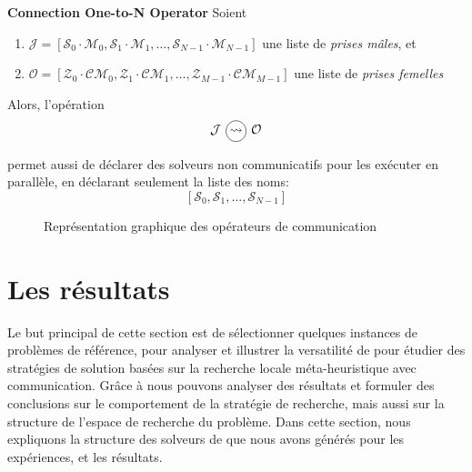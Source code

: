 \begin{definition}\label{op_conn:1ton}
{\bf Connection One-to-N Operator} Soient 
\begin{enumerate} 
\item $\mathcal{J} = \left[\mathcal{S}_0\cdot \mathcal{M}_0, \mathcal{S}_1\cdot \mathcal{M}_1,\dots, \mathcal{S}_{N-1}\cdot \mathcal{M}_{N-1}\right]$ une liste de  {\it prises mâles}, et
\item $\mathcal{O} = \left[\mathcal{Z}_0\cdot \mathcal{CM}_0, \mathcal{Z}_1\cdot \mathcal{CM}_1,\dots, \mathcal{Z}_{M-1}\cdot \mathcal{CM}_{M-1}\right]$ une liste de {\it prises femelles}
\end{enumerate} Alors, l'opération
\[
\mathcal{J} \poslop{\rightsquigarrow} \mathcal{O}
\]
\end{definition}


\posl{} permet aussi de déclarer des solveurs non communicatifs pour les exécuter en parallèle, en déclarant seulement la liste des noms:
\[
\left[\mathcal{S}_0, \mathcal{S}_1, \dots, \mathcal{S}_{N-1}\right]
\]

\begin{figure}[t]
\centering
{}
\hspace{0.05\textwidth}%
\caption[]{Représentation graphique des opérateurs de communication}
\label{fig:comm}
\end{figure}






\section{Les résultats}

Le but principal de cette section est de sélectionner quelques instances de problèmes de référence, pour analyser et illustrer la versatilité de \posl{} pour étudier des stratégies de solution basées sur la recherche locale méta-heuristique avec communication. Grâce à \posl{} nous pouvons analyser des résultats et formuler des conclusions sur le comportement de la stratégie de recherche, mais aussi sur la structure de l'espace de recherche du problème. Dans cette section, nous expliquons la structure des  solveurs de \posl{} que nous avons générés pour les expériences, et les résultats.

